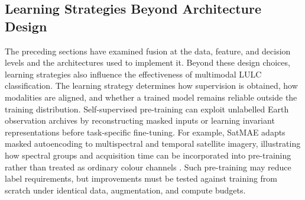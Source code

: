 \documentclass[]{interact}
\theoremstyle{plain}%
\theoremstyle{definition}
\theoremstyle{remark}
\DeclareRobustCommand{\DIFadd}[1]{{\protect\color{DIFaddcolor}\uwave{#1}}}
\def\DIFadd#1{#1}%
\begin{document}
\subsection{\DIFadd{Learning} \DIFadd{Strategies} \DIFadd{Beyond} \DIFadd{Architecture} \DIFadd{Design}}

\DIFadd{The} \DIFadd{preceding} \DIFadd{sections} \DIFadd{have} \DIFadd{examined} \DIFadd{fusion} \DIFadd{at} \DIFadd{the} \DIFadd{data}\DIFadd{,} \DIFadd{feature}\DIFadd{,} \DIFadd{and} \DIFadd{decision} \DIFadd{levels} \DIFadd{and} \DIFadd{the} \DIFadd{architectures} \DIFadd{used} \DIFadd{to} \DIFadd{implement} \DIFadd{it}\DIFadd{.} \DIFadd{Beyond} \DIFadd{these} \DIFadd{design} \DIFadd{choices}\DIFadd{,} \DIFadd{learning} \DIFadd{strategies} \DIFadd{also} \DIFadd{influence} \DIFadd{the} \DIFadd{effectiveness} \DIFadd{of} \DIFadd{multimodal} \DIFadd{LULC} \DIFadd{classification}\DIFadd{.} \DIFadd{The} \DIFadd{learning} \DIFadd{strategy} \DIFadd{determines} \DIFadd{how} \DIFadd{supervision} \DIFadd{is} \DIFadd{obtained}\DIFadd{,} \DIFadd{how} \DIFadd{modalities} \DIFadd{are} \DIFadd{aligned}\DIFadd{,} \DIFadd{and} \DIFadd{whether} \DIFadd{a} \DIFadd{trained} \DIFadd{model} \DIFadd{remains} \DIFadd{reliable} \DIFadd{outside} \DIFadd{the} \DIFadd{training} \DIFadd{distribution}\DIFadd{.} \DIFadd{Self-supervised} \DIFadd{pre-training} \DIFadd{can} \DIFadd{exploit} \DIFadd{unlabelled} \DIFadd{Earth} \DIFadd{observation} \DIFadd{archives} \DIFadd{by} \DIFadd{reconstructing} \DIFadd{masked} \DIFadd{inputs} \DIFadd{or} \DIFadd{learning} \DIFadd{invariant} \DIFadd{representations} \DIFadd{before} \DIFadd{task-specific} \DIFadd{fine-tuning}\DIFadd{.} \DIFadd{For} \DIFadd{example}\DIFadd{,} \DIFadd{SatMAE} \DIFadd{adapts} \DIFadd{masked} \DIFadd{autoencoding} \DIFadd{to} \DIFadd{multispectral} \DIFadd{and} \DIFadd{temporal} \DIFadd{satellite} \DIFadd{imagery}\DIFadd{,} \DIFadd{illustrating} \DIFadd{how} \DIFadd{spectral} \DIFadd{groups} \DIFadd{and} \DIFadd{acquisition} \DIFadd{time} \DIFadd{can} \DIFadd{be} \DIFadd{incorporated} \DIFadd{into} \DIFadd{pre-training} \DIFadd{rather} \DIFadd{than} \DIFadd{treated} \DIFadd{as} \DIFadd{ordinary} \DIFadd{colour} \DIFadd{channels} {\color{blue}\citep{cong2022satmae}}\DIFadd{.} \DIFadd{Such} \DIFadd{pre-training} \DIFadd{may} \DIFadd{reduce} \DIFadd{label} \DIFadd{requirements}\DIFadd{,} \DIFadd{but} \DIFadd{improvements} \DIFadd{must} \DIFadd{be} \DIFadd{tested} \DIFadd{against} \DIFadd{training} \DIFadd{from} \DIFadd{scratch} \DIFadd{under} \DIFadd{identical} \DIFadd{data}\DIFadd{,} \DIFadd{augmentation}\DIFadd{,} \DIFadd{and} \DIFadd{compute} \DIFadd{budgets}\DIFadd{.}
\end{document}
